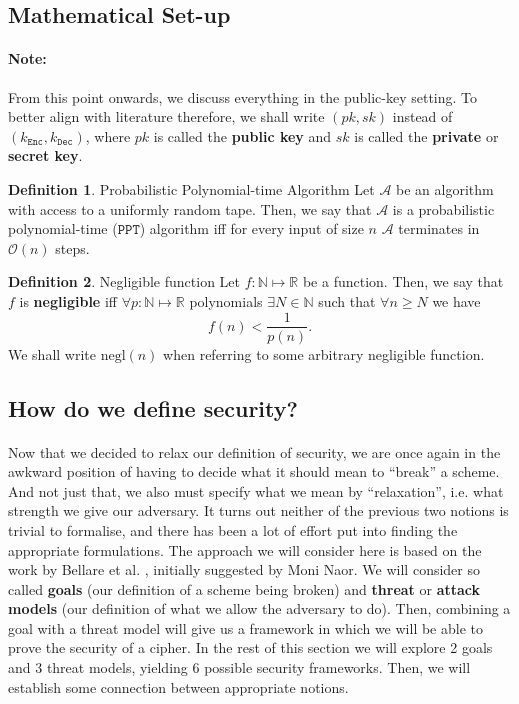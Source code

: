 \documentclass{article}
\theoremstyle{definition}
\newtheorem{definition}{Definition}[section]
\theoremstyle{example}
\newcommand{\Enc}{\texttt{Enc}}
\newcommand{\Dec}{\texttt{Dec}}
\newcommand{\A}{\mathcal{A}}
\newcommand{\Oh}{\mathcal{O}}
\newcommand{\Nat}{\mathbb{N}}
\newcommand{\Reals}{\mathbb{R}}
\newcommand{\PPT}{\texttt{PPT}}
\newcommand{\negl}{\text{negl}}
\begin{document}
\subsection{Mathematical Set-up}
\paragraph{Note:} From this point onwards, we discuss everything in the
public-key setting. To better align with literature therefore, we shall write
$(pk, sk)$ instead of $(k_\Enc, k_\Dec)$, where $pk$ is called the \textbf{public key}
and $sk$ is called the \textbf{private} or \textbf{secret key}.
\begin{definition}{Probabilistic Polynomial-time Algorithm}
 Let $\A$ be an algorithm with access to a uniformly random tape. Then, we say that $\A$
 is a probabilistic polynomial-time ($\PPT$) algorithm iff for every input of size
 $n$ $\A$ terminates in $\Oh(n)$ steps. 
\end{definition}
\begin{definition}{Negligible function}
  Let $f: \Nat \mapsto \Reals$ be a function. Then, we say that $f$ is
  \textbf{negligible} iff $\forall p: \Nat \mapsto \Reals$ polynomials $\exists
  N \in \Nat$ such that $\forall n \geq N$ we have
  \[
    f(n) < \frac{1}{p(n)}. 
  \]
  We shall write $\negl(n)$ when referring to some arbitrary negligible function.
\end{definition}
\subsection{How do we define security?}
\label{sec:howdefsec}
\paragraph{} Now that we decided to relax our definition of security, we are
once again in the awkward position of having to decide what it should mean to
``break'' a scheme. And not just that, we also must specify what we mean by
``relaxation'', i.e. what strength we give our adversary. It turns out neither
of the previous two notions is trivial to formalise, and there has been a lot of
effort put into finding the appropriate formulations. The approach we will consider here is based on the work by Bellare
et al. \cite{bellaresecurityrelations}, initially suggested by Moni
Naor\footnotemark. We will consider so
called \textbf{goals} (our definition of a scheme being broken) and \textbf{threat} or
\textbf{attack models} (our definition of what we allow the adversary to do).
Then, combining a goal with a threat model will give us a framework in which we
will be able to prove the security of a cipher. In the rest of this section we
will explore 2 goals and 3 threat models, yielding 6 possible security
frameworks. Then, we will establish some connection between appropriate notions.
\end{document}
